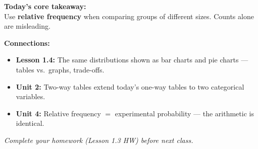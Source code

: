 \documentclass[aspectratio=169, 11pt]{beamer}
\begin{document}
{
\begin{frame}[t, plain]
  \vspace{1.2cm}\par
  \hspace{0.55cm}%
  \begin{minipage}{0.9\textwidth}
    \small

    {\color{goldacc}\bfseries Today's core takeaway:}\\[6pt]
    {\color{white}
    Use \textbf{relative frequency} when comparing groups of different sizes.
    Counts alone are misleading.}

    \vspace{0.55cm}
    {\color{skymid}\bfseries Connections:}
    \begin{itemize}
      \setlength{\itemsep}{0.35em}
      \item {\color{white}
            \textbf{Lesson 1.4:} The same distributions shown as bar charts and
            pie charts --- tables vs.\ graphs, trade-offs.}
      \item {\color{white}
            \textbf{Unit 2:} Two-way tables extend today's one-way tables to
            two categorical variables.}
      \item {\color{white}
            \textbf{Unit 4:} Relative frequency $=$ experimental probability ---
            the arithmetic is identical.}
    \end{itemize}

    \vspace{0.55cm}
    {\color{skymid}\small\itshape
      Complete your homework (Lesson 1.3 HW) before next class.}
  \end{minipage}
\end{frame}
}
\end{document}
